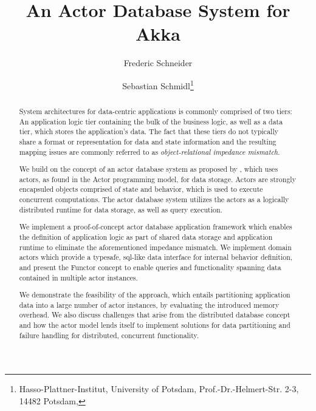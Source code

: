\documentclass[english,utf8,biblatex]{lni-tex/lni}
\author[Frederic Schneider \and Sebastian Schmidl]{%
Frederic Schneider \and
Sebastian Schmidl\footnote{Hasso-Plattner-Institut, University of Potsdam, Prof.-Dr.-Helmert-Str. 2-3, 14482 Potsdam, \email{{frederic.schneider,sebastian.schmidl}@student.hpi.de}}
}
\title[An Actor Database System for Akka]{An Actor Database System for Akka}
\begin{document}
\maketitle

\setcounter{footnote}{2}

\begin{abstract}
  System architectures for data-centric applications is commonly comprised of two tiers:
  An application logic tier containing the bulk of the business logic, as well as a data tier, which stores the application's data.
  The fact that these tiers do not typically share a format or representation for data and state information and the resulting mapping issues are commonly referred to as \textit{object-relational impedance mismatch}. %

  We build on the concept of an actor database system as proposed by \citet{Shah:reactdb}, which uses actors, as found in the Actor programming model, for data storage.
  Actors are strongly encapsuled objects comprised of state and behavior, which is used to execute concurrent computations.
  The actor database system utilizes the actors as a logically distributed runtime for data storage, as well as query execution.

  We implement a proof-of-concept actor database application framework which enables the definition of application logic as part of shared data storage and application runtime to eliminate the aforementioned impedance mismatch.
  We implement domain actors which provide a typesafe, sql-like data interface for internal behavior definition,
  and present the Functor concept to enable queries and functionality spanning data contained in multiple actor instances.

  We demonstrate the feasibility of the approach, which entails partitioning application data into a large number of actor instances, by evaluating the introduced memory overhead.
  We also discuss challenges that arise from the distributed database concept and how the actor model lends itself to implement solutions for data partitioning and failure handling for distributed, concurrent functionality.
\end{abstract}




\printbibliography
\end{document}
